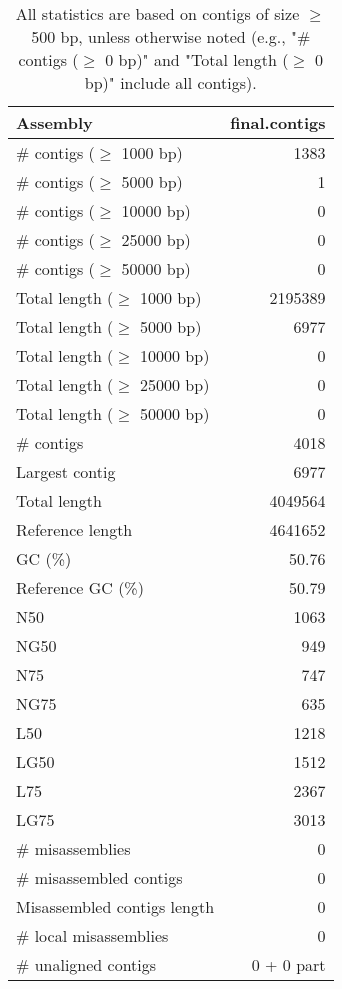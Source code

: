 \documentclass[12pt,a4paper]{article}
\begin{document}
\begin{table}[ht]
\begin{center}
\caption{All statistics are based on contigs of size $\geq$ 500 bp, unless otherwise noted (e.g., "\# contigs ($\geq$ 0 bp)" and "Total length ($\geq$ 0 bp)" include all contigs).}
\begin{tabular}{|l*{1}{|r}|}
\hline
Assembly & final.contigs \\ \hline
\# contigs ($\geq$ 1000 bp) & 1383 \\ \hline
\# contigs ($\geq$ 5000 bp) & 1 \\ \hline
\# contigs ($\geq$ 10000 bp) & 0 \\ \hline
\# contigs ($\geq$ 25000 bp) & 0 \\ \hline
\# contigs ($\geq$ 50000 bp) & 0 \\ \hline
Total length ($\geq$ 1000 bp) & 2195389 \\ \hline
Total length ($\geq$ 5000 bp) & 6977 \\ \hline
Total length ($\geq$ 10000 bp) & 0 \\ \hline
Total length ($\geq$ 25000 bp) & 0 \\ \hline
Total length ($\geq$ 50000 bp) & 0 \\ \hline
\# contigs & 4018 \\ \hline
Largest contig & 6977 \\ \hline
Total length & 4049564 \\ \hline
Reference length & 4641652 \\ \hline
GC (\%) & 50.76 \\ \hline
Reference GC (\%) & 50.79 \\ \hline
N50 & 1063 \\ \hline
NG50 & 949 \\ \hline
N75 & 747 \\ \hline
NG75 & 635 \\ \hline
L50 & 1218 \\ \hline
LG50 & 1512 \\ \hline
L75 & 2367 \\ \hline
LG75 & 3013 \\ \hline
\# misassemblies & 0 \\ \hline
\# misassembled contigs & 0 \\ \hline
Misassembled contigs length & 0 \\ \hline
\# local misassemblies & 0 \\ \hline
\# unaligned contigs & 0 + 0 part \\ \hline

\end{tabular}
\end{center}
\end{table}
\end{document}
